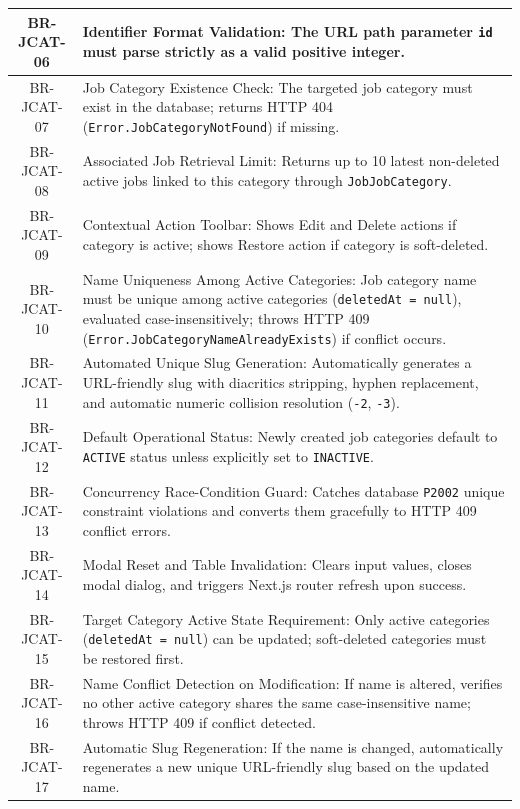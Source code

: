 \begin{longtable}{|c|p{12cm}|}
    BR-JCAT-06 & Identifier Format Validation: The URL path parameter \texttt{id} must parse strictly as a valid positive integer. \\ \hline
    BR-JCAT-07 & Job Category Existence Check: The targeted job category must exist in the database; returns HTTP 404 (\texttt{Error.\allowbreak Job\allowbreak Category\allowbreak Not\allowbreak Found}) if missing. \\ \hline
    BR-JCAT-08 & Associated Job Retrieval Limit: Returns up to 10 latest non-deleted active jobs linked to this category through \texttt{JobJobCategory}. \\ \hline
    BR-JCAT-09 & Contextual Action Toolbar: Shows Edit and Delete actions if category is active; shows Restore action if category is soft-deleted. \\ \hline
    BR-JCAT-10 & Name Uniqueness Among Active Categories: Job category name must be unique among active categories (\texttt{deletedAt = null}), evaluated case-insensitively; throws HTTP 409 (\texttt{Error.\allowbreak Job\allowbreak Category\allowbreak Name\allowbreak Already\allowbreak Exists}) if conflict occurs. \\ \hline
    BR-JCAT-11 & Automated Unique Slug Generation: Automatically generates a URL-friendly slug with diacritics stripping, hyphen replacement, and automatic numeric collision resolution (\texttt{-2}, \texttt{-3}). \\ \hline
    BR-JCAT-12 & Default Operational Status: Newly created job categories default to \texttt{ACTIVE} status unless explicitly set to \texttt{INACTIVE}. \\ \hline
    BR-JCAT-13 & Concurrency Race-Condition Guard: Catches database \texttt{P2002} unique constraint violations and converts them gracefully to HTTP 409 conflict errors. \\ \hline
    BR-JCAT-14 & Modal Reset and Table Invalidation: Clears input values, closes modal dialog, and triggers Next.js router refresh upon success. \\ \hline
    BR-JCAT-15 & Target Category Active State Requirement: Only active categories (\texttt{deletedAt = null}) can be updated; soft-deleted categories must be restored first. \\ \hline
    BR-JCAT-16 & Name Conflict Detection on Modification: If name is altered, verifies no other active category shares the same case-insensitive name; throws HTTP 409 if conflict detected. \\ \hline
    BR-JCAT-17 & Automatic Slug Regeneration: If the name is changed, automatically regenerates a new unique URL-friendly slug based on the updated name. \\ \hline

\end{longtable}

